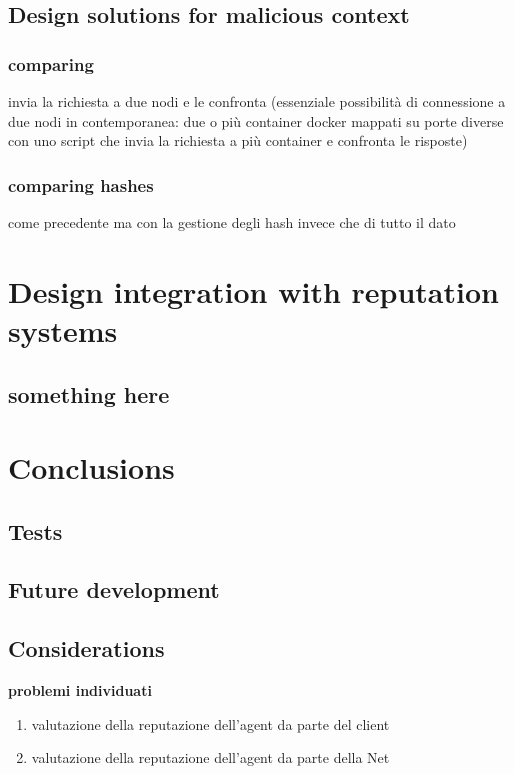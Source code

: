 \documentclass[]{article}
\begin{document}
	\subsection{Design solutions for malicious context}
		\subsubsection{comparing}
		invia la richiesta a due nodi e le confronta (essenziale possibilità di connessione a due nodi in contemporanea: due o più container docker mappati su porte diverse con uno script che invia la richiesta a più container e confronta le risposte)
		\subsubsection{comparing hashes}
		come precedente ma con la gestione degli hash invece che di tutto il dato
	\section{Design integration with reputation systems}
	
	\subsection{something here}
	
		
\section{Conclusions}
	\subsection{Tests}
	\subsection{Future development}
	\subsection{Considerations}

	\pagebreak

	\textbf{problemi individuati}
	\begin{enumerate}
		\item valutazione della reputazione dell'agent da parte del client
		\item valutazione della reputazione dell'agent da parte della Net
	\end{enumerate}
	
\end{document}
